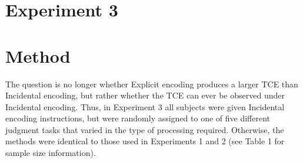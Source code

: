 \documentclass[jou,natbib]{apa6} %
\begin{document}










\section{Experiment 3}
\section{Method}
The question is no longer whether Explicit encoding produces a larger TCE than Incidental encoding, but rather whether the TCE can ever be observed under Incidental encoding. Thus, in Experiment 3 all subjects were given Incidental encoding instructions, but were randomly assigned to one of five different judgment tasks that varied in the type of processing required. Otherwise, the methods were identical to those used in Experiments 1 and 2 (see Table 1 for sample size information).
\end{document}

